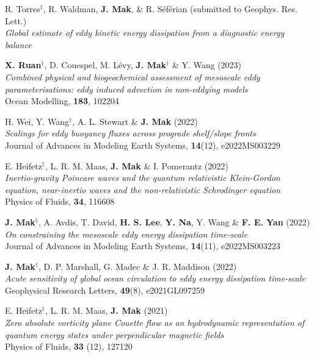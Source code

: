 \documentclass[letterpaper]{article}
\renewenvironment{itemize}{
  \begin{list}{}{
    \setlength{\leftmargin}{1.5em}
  }
}{
  \end{list}
}
\begin{document}
\begin{itemize}
\item[*] R. Torres$^{\dagger}$, R. Waldman, \textbf{J. Mak}, \& R. S\'ef\'erian (submitted to Geophys. Res. Lett.)\\
\textit{Global estimate of eddy kinetic energy dissipation from a diagnostic energy balance}

\item[17.] \textbf{X. Ruan}$^{\dagger}$, D. Couespel, M. L\'evy, \textbf{J. Mak}$^{\dagger}$ \& Y. Wang (2023)\\
\textit{Combined physical and biogeochemical assessment of mesoscale eddy parameterisations: eddy induced advection in non-eddying models}\\
Ocean Modelling, \textbf{183}, 102204

\item[16.] H. Wei, Y. Wang$^{\dagger}$, A. L. Stewart \& \textbf{J. Mak}
(2022)\\
\textit{Scalings for eddy buoyancy fluxes across prograde shelf/slope fronts}\\
Journal of Advances in Modeling Earth Systems, \textbf{14}(12), e2022MS003229

\item[15.] E. Heifetz$^{\dagger}$, L. R. M. Maas, \textbf{J. Mak} \& I. Pomerantz (2022)\\
\textit{Inertio-gravity Poincare waves and the quantum relativistic Klein-Gordon equation, near-inertio waves and the non-relativistic Schrodinger equation}\\
Physics of Fluids, \textbf{34}, 116608

\item[14.] \textbf{J. Mak}$^{\dagger}$, A. Avdis, T. David, \textbf{H. S. Lee}, \textbf{Y. Na}, Y. Wang \& \textbf{F. E. Yan} (2022)\\
\textit{On constraining the mesoscale eddy energy dissipation time-scale}\\
Journal of Advances in Modeling Earth Systems, \textbf{14}(11), e2022MS003223

\item[13.] \textbf{J. Mak}$^{\dagger}$, D. P. Marshall, G. Madec \& J. R. Maddison (2022)\\
\textit{Acute sensitivity of global ocean circulation to eddy energy dissipation time-scale}\\
Geophysical Research Letters, \textbf{49}(8), e2021GL097259

\item[12.] E. Heifetz$^{\dagger}$, L. R. M. Maas, \textbf{J. Mak} (2021)\\
\textit{Zero absolute vorticity plane Couette flow as an hydrodynamic representation of quantum energy states under perpendicular magnetic fields}\\
Physics of Fluids, \textbf{33} (12), 127120


\end{itemize}
\end{document}
